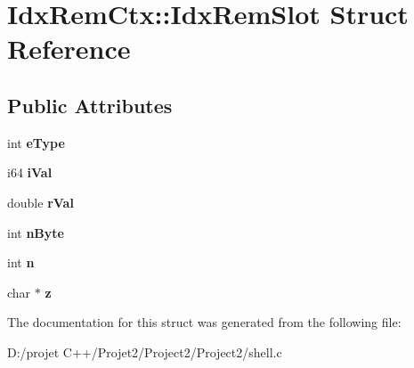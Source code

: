 \hypertarget{struct_idx_rem_ctx_1_1_idx_rem_slot}{}\section{Idx\+Rem\+Ctx\+:\+:Idx\+Rem\+Slot Struct Reference}
\label{struct_idx_rem_ctx_1_1_idx_rem_slot}
\subsection*{Public Attributes}
\begin{DoxyCompactItemize}
\item 
\mbox{\label{struct_idx_rem_ctx_1_1_idx_rem_slot_a265033a3e24def7aefa926d2a5b5bdad}} 
int {\bfseries e\+Type}
\item 
\mbox{\label{struct_idx_rem_ctx_1_1_idx_rem_slot_a060b83245f6170852fcfce5f9c7d6720}} 
i64 {\bfseries i\+Val}
\item 
\mbox{\label{struct_idx_rem_ctx_1_1_idx_rem_slot_a0536b0bee1a88890a607d59308065bd0}} 
double {\bfseries r\+Val}
\item 
\mbox{\label{struct_idx_rem_ctx_1_1_idx_rem_slot_a74cf4fbcdd71fc2dd7a759832a506707}} 
int {\bfseries n\+Byte}
\item 
\mbox{\label{struct_idx_rem_ctx_1_1_idx_rem_slot_ac972040b06bba6c24c7113a39ca0a7b2}} 
int {\bfseries n}
\item 
\mbox{\label{struct_idx_rem_ctx_1_1_idx_rem_slot_ab1b3af4f6dcd87c3a57018d0f449e7b0}} 
char $\ast$ {\bfseries z}
\end{DoxyCompactItemize}


The documentation for this struct was generated from the following file\+:\begin{DoxyCompactItemize}
\item 
D\+:/projet C++/\+Projet2/\+Project2/\+Project2/shell.\+c\end{DoxyCompactItemize}

